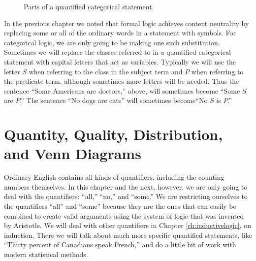 \begin{figure}
\caption{Parts of a quantified categorical statement.}
\label{fig:Partsofacategoricalstatement}
\end{figure}

In the previous chapter we noted that formal logic achieves content neutrality by replacing some or all of the ordinary words in a statement with symbols. For categorical logic, we are only going to be making one such substitution. Sometimes we will replace the classes referred to in a quantified categorical statement with capital letters that act as variables. Typically we will use the letter $S$ when referring to the class in the subject term and $P$ when referring to the predicate term, although sometimes more letters will be needed. Thus the sentence ``Some Americans are doctors,'' above, will sometimes become ``Some $S$ are $P$.'' The sentence ``No dogs are cats'' will sometimes become``No $S$ is $P$.''

\section{Quantity, Quality, Distribution, and Venn Diagrams}\label{sec:QQDVD}

Ordinary English contains all kinds of quantifiers, including the counting numbers themselves. In this chapter and the next, however, we are only going to deal with the quantifiers: ``all,'' ``no,'' and ``some.'' We are restricting ourselves to the quantifiers ``all'' and ``some'' because they are the ones that can easily be combined to create valid arguments using the system of logic that was invented by Aristotle. We will deal with other quantifiers in Chapter \ref{ch:inductivelogic}, on induction. There we will talk about much more specific quantified statements, like ``Thirty percent of Canadians speak French,'' and do a little bit of work with modern statistical methods.


